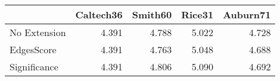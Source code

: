 \begin{tabular}{lrrrr}
\toprule
{} & Caltech36 & Smith60 & Rice31 & Auburn71 \\
\midrule
No Extension &     4.391 &   4.788 &  5.022 &    4.728 \\
EdgesScore   &     4.391 &   4.763 &  5.048 &    4.688 \\
Significance &     4.391 &   4.806 &  5.090 &    4.692 \\
\bottomrule
\end{tabular}
